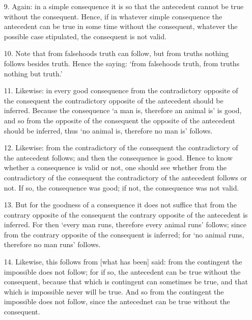 \documentclass[]{article}
\begin{document}
\begin{itemize}
{	many consequences occur varied L} the consequence \textit{from the first}, etc. is not valid. Note that consequences which are intermediate are varied when the antecedent in the second conditional is different from what the consequent was in the first conditional. As is shown if one argues: `if no time is, it is not day; and if it is not day and some time is, then it is night; and if it is night, some time is; therefore \textit{from the first to the last}: if no time is, some time is.' This consequence does not hold \textit{from the first to the last}, since the consequent of the first conditional is `it is not day,' and the antecedent of the second conditional is the whole `it is not day, and some time is,' and so \textit{from the first to the last} does not apply.
\item[9.] Again: in a simple consequence it is so that the antecedent cannot be true without the consequent. Hence, if in whatever simple consequence the antecedent can be true in some time without the consequent, whatever the possible case stipulated, the consequent is not valid.
\item[10.] Note that from falsehoods truth can follow, but from truths nothing follows besides truth. Hence the saying: `from falsehoods truth, from truths nothing but truth.'
\item[11.] Likewise: in every good consequence from the contradictory opposite of the consequent the contradictory opposite of the antecedent should be inferred. Because the consequence `a man is, therefore an animal is' is good, and so from the opposite of the consequent the opposite of the antecedent should be inferred, thus `no animal is, therefore no man is' follows.
\item[12.] Likewise: from the contradictory of the consequent the contradictory of the antecedent follows; and then the consequence is good. Hence to know whether a consequence is valid or not, one should see whether from the contradictory of the consequent the contradictory of the antecedent follows or not. If so, the consequence was good; if not, the consequence was not valid.
\item[13.] But for the goodness of a consequence it does not suffice that from the contrary opposite of the consequent the contrary opposite of the antecedent is inferred. For then `every man runs, therefore every animal runs' follows; since from the contrary opposite of the consequent is inferred; for `no animal runs, therefore no man runs' follows.
\item[14.] Likewise, this follows from [what has been] said: from the contingent the impossible does not follow; for if so, the antecedent can be true without the consequent, because that which is contingent can sometimes be true, and that which is impossible never will be true. And so from the contingent the impossible does not follow, since the antecednet can be true without the consequent.

\end{itemize}
\end{document}
